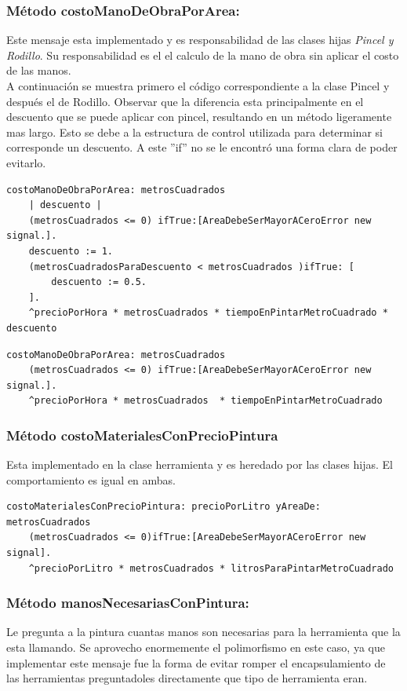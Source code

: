 \documentclass[titlepage,a4paper]{article}
\begin{document}
\subsubsection*{Método costoManoDeObraPorArea:}
\indent Este mensaje esta implementado y es responsabilidad de las clases hijas \textit{Pincel y Rodillo}. Su responsabilidad es el el calculo de la mano de obra sin aplicar el costo de las manos. \\
\indent A continuación se muestra primero el código correspondiente a la clase Pincel y después el de Rodillo. Observar que la diferencia esta principalmente en el descuento que se puede aplicar con pincel, resultando en un método ligeramente mas largo. Esto se debe a la estructura de control utilizada para determinar si corresponde un descuento. A este ''if''  no se le encontró una forma clara de poder evitarlo.
\newpage
\begin{verbatim}
costoManoDeObraPorArea: metrosCuadrados
    | descuento |
    (metrosCuadrados <= 0) ifTrue:[AreaDebeSerMayorACeroError new signal.].
    descuento := 1.
    (metrosCuadradosParaDescuento < metrosCuadrados )ifTrue: [  
        descuento := 0.5.
    ].
    ^precioPorHora * metrosCuadrados * tiempoEnPintarMetroCuadrado * descuento
\end{verbatim}

\begin{verbatim}
costoManoDeObraPorArea: metrosCuadrados
    (metrosCuadrados <= 0) ifTrue:[AreaDebeSerMayorACeroError new signal.].
    ^precioPorHora * metrosCuadrados  * tiempoEnPintarMetroCuadrado
\end{verbatim}

\medskip
\subsubsection*{Método costoMaterialesConPrecioPintura}
\indent Esta implementado en la clase herramienta y es heredado por las clases hijas. El comportamiento es igual en ambas.

\begin{verbatim}
costoMaterialesConPrecioPintura: precioPorLitro yAreaDe: metrosCuadrados
    (metrosCuadrados <= 0)ifTrue:[AreaDebeSerMayorACeroError new signal].
    ^precioPorLitro * metrosCuadrados * litrosParaPintarMetroCuadrado 
\end{verbatim}

\medskip
\subsubsection*{Método manosNecesariasConPintura:}
\indent Le pregunta a la pintura cuantas manos son necesarias para la herramienta que la esta llamando. Se aprovecho enormemente el polimorfismo en este caso, ya que implementar este mensaje fue la forma de evitar romper el encapsulamiento de las herramientas preguntadoles directamente que tipo de herramienta eran.
\end{document}

